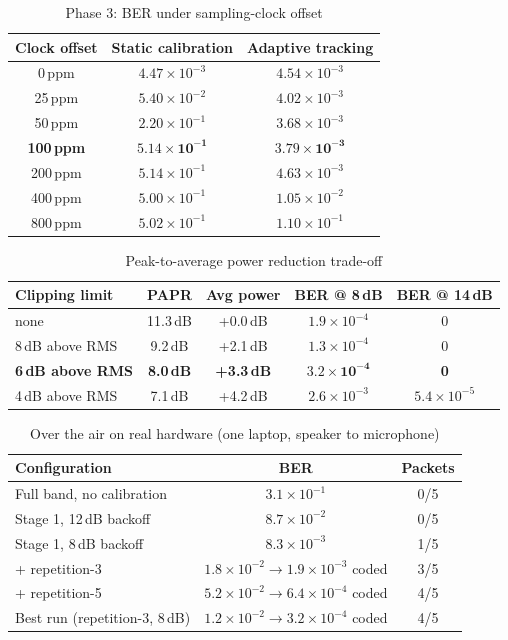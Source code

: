 \documentclass[11pt,a4paper]{report}
\begin{document}
\begin{table}[htbp]
\centering
\small
\begin{tabular}{|c|c|c|}
\hline
\textbf{Clock offset} & \textbf{Static calibration} & \textbf{Adaptive tracking} \\
\hline
0\,ppm & $4.47\times10^{-3}$ & $4.54\times10^{-3}$ \\
25\,ppm & $5.40\times10^{-2}$ & $4.02\times10^{-3}$ \\
50\,ppm & $2.20\times10^{-1}$ & $3.68\times10^{-3}$ \\
\textbf{100\,ppm} & $\mathbf{5.14\times10^{-1}}$ & $\mathbf{3.79\times10^{-3}}$ \\
200\,ppm & $5.14\times10^{-1}$ & $4.63\times10^{-3}$ \\
400\,ppm & $5.00\times10^{-1}$ & $1.05\times10^{-2}$ \\
800\,ppm & $5.02\times10^{-1}$ & $1.10\times10^{-1}$ \\
\hline
\end{tabular}
\caption{Phase 3: BER under sampling-clock offset}
\end{table}

\begin{table}[htbp]
\centering
\small
\begin{tabular}{|l|c|c|c|c|}
\hline
\textbf{Clipping limit} & \textbf{PAPR} & \textbf{Avg power} & \textbf{BER @ 8\,dB} & \textbf{BER @ 14\,dB} \\
\hline
none & 11.3\,dB & +0.0\,dB & $1.9\times10^{-4}$ & 0 \\
8\,dB above RMS & 9.2\,dB & +2.1\,dB & $1.3\times10^{-4}$ & 0 \\
\textbf{6\,dB above RMS} & \textbf{8.0\,dB} & \textbf{+3.3\,dB} & $\mathbf{3.2\times10^{-4}}$ & \textbf{0} \\
4\,dB above RMS & 7.1\,dB & +4.2\,dB & $2.6\times10^{-3}$ & $5.4\times10^{-5}$ \\
\hline
\end{tabular}
\caption{Peak-to-average power reduction trade-off}
\label{tab:papr}
\end{table}

\begin{table}[htbp]
\centering
\small
\begin{tabular}{|l|c|c|}
\hline
\textbf{Configuration} & \textbf{BER} & \textbf{Packets} \\
\hline
Full band, no calibration & $3.1\times10^{-1}$ & 0/5 \\
Stage 1, 12\,dB backoff & $8.7\times10^{-2}$ & 0/5 \\
Stage 1, 8\,dB backoff & $8.3\times10^{-3}$ & 1/5 \\
+ repetition-3 & $1.8\times10^{-2}\rightarrow1.9\times10^{-3}$ coded & 3/5 \\
+ repetition-5 & $5.2\times10^{-2}\rightarrow6.4\times10^{-4}$ coded & 4/5 \\
Best run (repetition-3, 8\,dB) & $1.2\times10^{-2}\rightarrow3.2\times10^{-4}$ coded & 4/5 \\
\hline
\end{tabular}
\caption{Over the air on real hardware (one laptop, speaker to microphone)}
\end{table}
\end{document}

